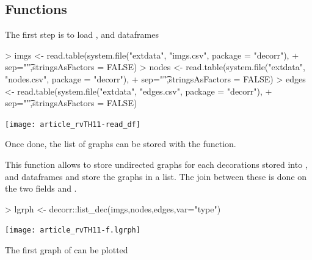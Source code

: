 \documentclass[article]{jss}
\begin{document}
\subsection{Functions} \label{sec:functions}

The first step is to load ,  and  dataframes

\begin{Schunk}
\begin{Sinput}
> imgs <- read.table(system.file("extdata", "imgs.csv", package = "decorr"),
+                    sep="\t",stringsAsFactors = FALSE)
> nodes <- read.table(system.file("extdata", "nodes.csv", package = "decorr"),
+                     sep="\t",stringsAsFactors = FALSE)
> edges <- read.table(system.file("extdata", "edges.csv", package = "decorr"),
+                     sep="\t",stringsAsFactors = FALSE)
\end{Sinput}
\end{Schunk}
\texttt{[image: article\_rvTH11-read\_df]}

Once done, the list of graphs can be stored with the  function.


           
This function allows to store undirected graphs for each decorations stored into ,  and  dataframes and store the graphs in a list. The join between these  is done on the two fields  and .\\

\begin{Schunk}
\begin{Sinput}
> lgrph <- decorr::list_dec(imgs,nodes,edges,var="type")
\end{Sinput}
\end{Schunk}
\texttt{[image: article\_rvTH11-f.lgrph]}

The first graph of can be plotted
\end{document}
